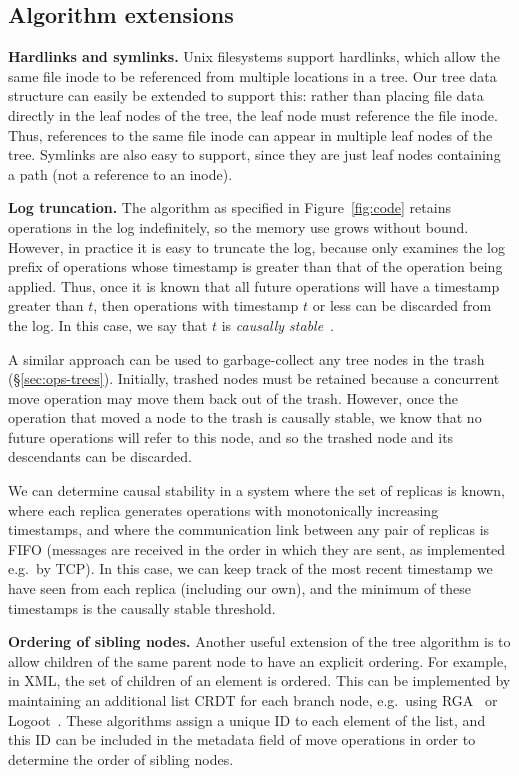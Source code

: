 \documentclass[10pt,journal,compsoc]{IEEEtran}
\begin{document}
\subsection{Algorithm extensions}\label{sec:extensions}

\noindent\textbf{Hardlinks and symlinks.}
Unix filesystems support hardlinks, which allow the same file inode to be referenced from multiple locations in a tree.
Our tree data structure can easily be extended to support this: rather than placing file data directly in the leaf nodes of the tree, the leaf node must reference the file inode.
Thus, references to the same file inode can appear in multiple leaf nodes of the tree.
Symlinks are also easy to support, since they are just leaf nodes containing a path (not a reference to an inode).

\smallbreak\noindent\textbf{Log truncation.}
The algorithm as specified in Figure~\ref{fig:code} retains operations in the log indefinitely, so the memory use grows without bound.
However, in practice it is easy to truncate the log, because  only examines the log prefix of operations whose timestamp is greater than that of the operation being applied.
Thus, once it is known that all future operations will have a timestamp greater than $t$, then operations with timestamp $t$ or less can be discarded from the log.
In this case, we say that $t$ is \emph{causally stable}~\cite{Baquero:2014ed}.

A similar approach can be used to garbage-collect any tree nodes in the trash (\S\ref{sec:ops-trees}).
Initially, trashed nodes must be retained because a concurrent move operation may move them back out of the trash.
However, once the operation that moved a node to the trash is causally stable, we know that no future operations will refer to this node, and so the trashed node and its descendants can be discarded.

We can determine causal stability in a system where the set of replicas is known, where each replica generates operations with monotonically increasing timestamps, and where the communication link between any pair of replicas is FIFO (messages are received in the order in which they are sent, as implemented e.g.\ by TCP).
In this case, we can keep track of the most recent timestamp we have seen from each replica (including our own), and the minimum of these timestamps is the causally stable threshold.

\smallbreak\noindent\textbf{Ordering of sibling nodes.}
Another useful extension of the tree algorithm is to allow children of the same parent node to have an explicit ordering.
For example, in XML, the set of children of an element is ordered.
This can be implemented by maintaining an additional list CRDT for each branch node, e.g.\ using RGA~\cite{Roh:2011dw} or Logoot~\cite{Weiss:2010hx}.
These algorithms assign a unique ID to each element of the list, and this ID can be included in the metadata field of move operations in order to determine the order of sibling nodes.
\end{document}
